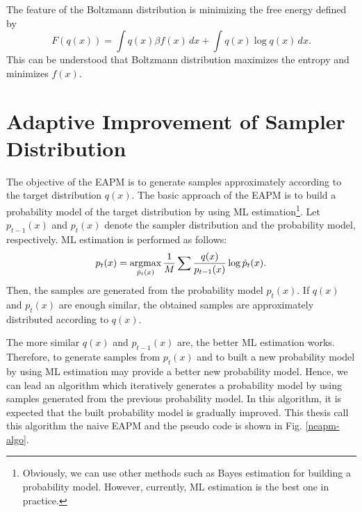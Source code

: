 The feature of the Boltzmann distribution is minimizing the free energy
defined by
\begin{equation}
F(q(x)) = \int q(x) \beta f(x) \, dx + \int q(x) \log q(x) \, dx.
\end{equation}
This can be understood that
Boltzmann distribution
maximizes the entropy and minimizes $f(x)$.


\section{Adaptive Improvement of Sampler Distribution}
The objective of the EAPM is
to generate samples approximately according to the target distribution $q(x)$.
The basic approach of the EAPM is
to  build a probability model of the target distribution
by using ML estimation\footnote{
Obviously, we can use other methods such as Bayes estimation 
for building a probability model. 
However, currently, ML estimation is the best one in practice.
}.
Let $p_{t-1}(x)$ and $p_{t}(x)$ 
denote the sampler distribution and the probability model, respectively.
ML estimation is performed as follows:
\begin{equation}
 p_{t}(x)=\mathop{\rm argmax}\limits_{\hat p_{t}(x)} \frac{1}{M} \sum \frac{q(x)}{p_{t-1}(x)}\log
  \hat p_{t}(x).
\label{neapm-ml}
\end{equation}
Then, the samples are generated from the probability model $p_{t}(x)$.
If $q(x)$ and $p_t(x)$ are enough similar,
the obtained samples are approximately distributed according to $q(x)$.

The more similar $q(x)$ and $p_{t-1}(x)$ are,
the better ML estimation works. 
Therefore, to generate samples from $p_{t}(x)$ and to built a new
 probability model by using ML estimation may provide
a better new probability model.
Hence, we can lead an algorithm which
iteratively generates a probability model
by using samples generated from the previous probability model.
In this algorithm, it is expected that
the built probability model is gradually improved. 
This thesis call this algorithm the naive EAPM and
the pseudo code is shown in Fig. \ref{neapm-algo}.

